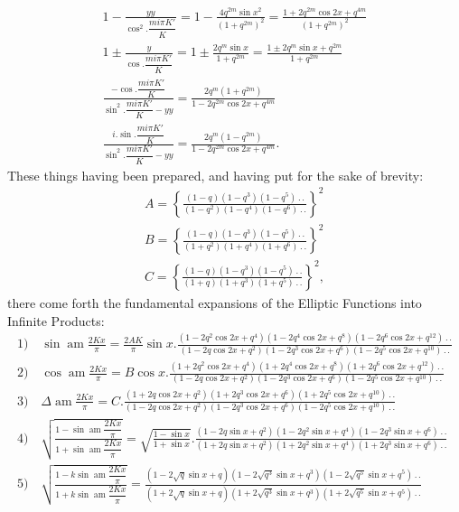 \documentclass{article}
\begin{document}
\[
\begin{gathered}
1-\frac{yy}{\cos^{2}.\dfrac{mi\pi K'}{K}}=1-\frac{4q^{2m}\sin x^{2}}{(1+q^{2m})^{2}}=\frac{1+2q^{2m}\cos 2x+q^{4m}}{(1+q^{2m})^{2}}
\\[2ex]
1\pm\frac{y}{\cos.\dfrac{mi\pi K'}{K}}=1\pm\frac{2q^{m}\sin x}{1+q^{2m}}=\frac{1\pm 2q^{m}\sin x+q^{2m}}{1+q^{2m}}
\\[2ex]
\frac{-\cos.\dfrac{mi\pi K'}{K}}{\sin^{2}.\dfrac{mi\pi K'}{K}-yy}=\frac{2q^{m}(1+q^{2m})}{1-2q^{2m}\cos 2x+q^{4m}}
\\[2ex]
\frac{i.\sin.\dfrac{mi\pi K'}{K}}{\sin^{2}.\dfrac{mi\pi K'}{K}-yy}=\frac{2q^{m}(1-q^{2m})}{1-2q^{2m}\cos 2x+q^{4m}}.
\end{gathered}
\]
These things having been prepared, and having put for the sake of brevity:
\[
\begin{gathered}
A=\left\{\frac{(1-q)(1-q^{3})(1-q^{5})\,.\,.}{(1-q^{2})(1-q^{4})(1-q^{6})\,.\,.}\right\}^{2}
\\[2ex]
B=\left\{\frac{(1-q)(1-q^{3})(1-q^{5})\,.\,.}{(1+q^{2})(1+q^{4})(1+q^{6})\,.\,.}\right\}^{2}
\\[2ex]
C=\left\{\frac{(1-q)(1-q^{3})(1-q^{5})\,.\,.}{(1+q)(1+q^{3})(1+q^{5})\,.\,.}\right\}^{2},
\end{gathered}
\]
there come forth the fundamental expansions of the Elliptic Functions into Infinite Products:
\[
\begin{gathered}
\text{1)}\quad\sin\operatorname{am}\frac{2Kx}{\pi}=\frac{2AK}{\pi}\sin x.\frac{(1-2q^{2}\cos 2x+q^{4})(1-2q^{4}\cos 2x+q^{8})(1-2q^{6}\cos 2x+q^{12})\,.\,.}{(1-2q\cos 2x+q^{2})(1-2q^{3}\cos 2x+q^{6})(1-2q^{5}\cos 2x+q^{10})\,.\,.}
\\[2ex]
\text{2)}\quad\cos\operatorname{am}\frac{2Kx}{\pi}=B\cos x.\frac{(1+2q^{2}\cos 2x+q^{4})(1+2q^{4}\cos 2x+q^{8})(1+2q^{6}\cos 2x+q^{12})\,.\,.}{(1-2q\cos 2x+q^{2})(1-2q^{3}\cos 2x+q^{6})(1-2q^{5}\cos 2x+q^{10})\,.\,.}
\\[2ex]
\text{3)}\quad\Delta\operatorname{am}\frac{2Kx}{\pi}=C.\frac{(1+2q\cos 2x+q^{2})(1+2q^{3}\cos 2x+q^{6})(1+2q^{5}\cos 2x+q^{10})\,.\,.}{(1-2q\cos 2x+q^{2})(1-2q^{3}\cos 2x+q^{6})(1-2q^{5}\cos 2x+q^{10})\,.\,.}
\\[2ex]
\text{4)}\quad\sqrt{\frac{1-\sin\operatorname{am}\dfrac{2Kx}{\pi}}{1+\sin\operatorname{am}\dfrac{2Kx}{\pi}}}=\sqrt{\frac{1-\sin x}{1+\sin x}}.\frac{(1-2q\sin x+q^{2})(1-2q^{2}\sin x+q^{4})(1-2q^{3}\sin x+q^{6})\,.\,.}{(1+2q\sin x+q^{2})(1+2q^{2}\sin x+q^{4})(1+2q^{3}\sin x+q^{6})\,.\,.}
\\[2ex]
\text{5)}\quad\sqrt{\frac{1-k\sin\operatorname{am}\dfrac{2Kx}{\pi}}{1+k\sin\operatorname{am}\dfrac{2Kx}{\pi}}}=\frac{(1-2\sqrt{q}\sin x+q)(1-2\sqrt{q^{3}}\sin x+q^{3})(1-2\sqrt{q^{5}}\sin x+q^{5})\,.\,.}{(1+2\sqrt{q}\sin x+q)(1+2\sqrt{q^{3}}\sin x+q^{3})(1+2\sqrt{q^{5}}\sin x+q^{5})\,.\,.}
\end{gathered}
\]
\end{document}
